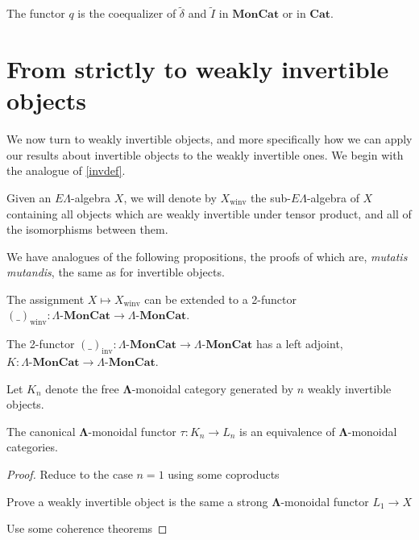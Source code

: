 \documentclass{amsbook} %
\newcommand{\mb}{\mathbf}
\newcommand{\ML}{\mathbf{\Lambda}}
\newcommand{\ELAlg}{\lmc}
\newcommand{\lmc}{\Lambda\mbox{-}\mb{MonCat}}
\newcommand{\moncat}{\ensuremath{\mb{MonCat}}}
\newcommand{\cat}{\ensuremath{\mb{Cat}}}
\numberwithin{section}{chapter}
\begin{document}
\begin{cor}\label{q_other_coeq2} The functor $q$  is the coequalizer of $\tilde{\delta}$ and $\tilde{I}$ in $\moncat$ or in $\cat$.
\end{cor}


\section{From strictly to weakly invertible objects}

We now turn to weakly invertible objects, and more specifically how we can apply our results about invertible objects to the weakly invertible ones. We begin with the analogue of \cref{invdef}.

\begin{Defi}\label{winvdef}
Given an $E\Lambda$-algebra $X$, we will denote by $X_{\mathrm{winv}}$ the sub-$E\Lambda$-algebra of $X$ containing all objects which are weakly invertible under tensor product, and all of the isomorphisms between them.
\end{Defi}

We have analogues of the following propositions, the proofs of which are, \textit{mutatis mutandis}, the same as for invertible objects.

\begin{prop} \label{winvprop} The assignment $X \mapsto X_{\mathrm{winv}}$ can be extended to a 2-functor $(\_)_{\mathrm{winv}} \colon  \ELAlg \to \ELAlg$.
\end{prop}

\begin{prop} \label{winvadj} The 2-functor $(\_)_{\mathrm{inv}} \colon  \ELAlg \to \ELAlg$ has a left adjoint, $K \colon  \ELAlg \to \ELAlg$.
\end{prop}

\begin{Defi}\label{kn}
Let $K_n$ denote the free $\ML$-monoidal category generated by $n$ weakly invertible objects.
\end{Defi}


\begin{thm}\label{L_is_K}
The canonical $\ML$-monoidal functor $\tau \colon K_n \to L_n$ is an equivalence of $\ML$-monoidal categories.
\end{thm}
\begin{proof}
Reduce to the case $n=1$ using some coproducts

Prove a weakly invertible object is the same a strong $\ML$-monoidal functor $L_1 \to X$

Use some coherence theorems
\end{proof}
\end{document}
